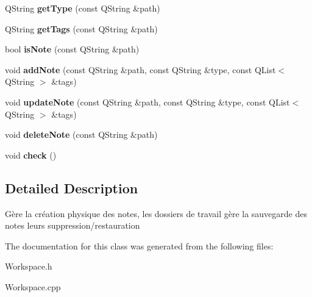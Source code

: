 \begin{DoxyCompactItemize}
\item 
\hypertarget{classWorkspace_ab6c5f71ce638d24afb51a2b649efbaa5}{\-Q\-String {\bfseries get\-Type} (const \-Q\-String \&path)}\label{classWorkspace_ab6c5f71ce638d24afb51a2b649efbaa5}

\item 
\hypertarget{classWorkspace_a85737d20bd3fc7dfa8fa67cd061e25ca}{\-Q\-String {\bfseries get\-Tags} (const \-Q\-String \&path)}\label{classWorkspace_a85737d20bd3fc7dfa8fa67cd061e25ca}

\item 
\hypertarget{classWorkspace_aa210a7b48674979f52c01a914204bde4}{bool {\bfseries is\-Note} (const \-Q\-String \&path)}\label{classWorkspace_aa210a7b48674979f52c01a914204bde4}

\item 
\hypertarget{classWorkspace_a52703ebffe544e4c68489ed5d902d79c}{void {\bfseries add\-Note} (const \-Q\-String \&path, const \-Q\-String \&type, const \-Q\-List$<$ \-Q\-String $>$ \&tags)}\label{classWorkspace_a52703ebffe544e4c68489ed5d902d79c}

\item 
\hypertarget{classWorkspace_ae63099b7935de34ecde80bb20a38d6d1}{void {\bfseries update\-Note} (const \-Q\-String \&path, const \-Q\-String \&type, const \-Q\-List$<$ \-Q\-String $>$ \&tags)}\label{classWorkspace_ae63099b7935de34ecde80bb20a38d6d1}

\item 
\hypertarget{classWorkspace_a83d87b636daffae2f8e91b3837ab450a}{void {\bfseries delete\-Note} (const \-Q\-String \&path)}\label{classWorkspace_a83d87b636daffae2f8e91b3837ab450a}

\item 
\hypertarget{classWorkspace_ac87ace25faf72934d2febf64defec99e}{void {\bfseries check} ()}\label{classWorkspace_ac87ace25faf72934d2febf64defec99e}

\end{DoxyCompactItemize}


\subsection{\-Detailed \-Description}
\-Gère la création physique des notes, les dossiers de travail gère la sauvegarde des notes leurs suppression/restauration 

\-The documentation for this class was generated from the following files\-:\begin{DoxyCompactItemize}
\item 
\-Workspace.\-h\item 
\-Workspace.\-cpp\end{DoxyCompactItemize}
